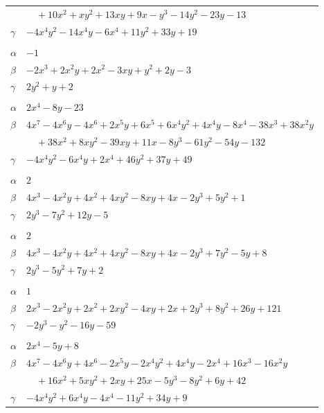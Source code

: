 \documentclass[11pt]{article}
\begin{document}
\begin{longtable}{@{}ll@{}}
 & $\quad +10x^{2}+xy^{2}+13xy+9x-y^{3}-14y^{2}-23y-13$\\
$\gamma$ & $-4x^{4}y^{2}-14x^{4}y-6x^{4}+11y^{2}+33y+19$\\
\addlinespace[3pt]
\multicolumn{2}{@{}l}{$\{i,j\}=\{6,20\}$, $k_{ij}=2^{2}$}\\
$\alpha$ & $-1$\\
$\beta$ & $-2x^{3}+2x^{2}y+2x^{2}-3xy+y^{2}+2y-3$\\
$\gamma$ & $2y^{2}+y+2$\\
\addlinespace[3pt]
\multicolumn{2}{@{}l}{$\{i,j\}=\{6,29\}$, $k_{ij}=2^{2}\cdot 3\cdot 5$}\\
$\alpha$ & $2x^{4}-8y-23$\\
$\beta$ & $4x^{7}-4x^{6}y-4x^{6}+2x^{5}y+6x^{5}+6x^{4}y^{2}+4x^{4}y-8x^{4}-38x^{3}+38x^{2}y$\\
 & $\quad +38x^{2}+8xy^{2}-39xy+11x-8y^{3}-61y^{2}-54y-132$\\
$\gamma$ & $-4x^{4}y^{2}-6x^{4}y+2x^{4}+46y^{2}+37y+49$\\
\addlinespace[3pt]
\multicolumn{2}{@{}l}{$\{i,j\}=\{7,9\}$, $k_{ij}=2^{3}$}\\
$\alpha$ & $2$\\
$\beta$ & $4x^{3}-4x^{2}y+4x^{2}+4xy^{2}-8xy+4x-2y^{3}+5y^{2}+1$\\
$\gamma$ & $2y^{3}-7y^{2}+12y-5$\\
\addlinespace[3pt]
\multicolumn{2}{@{}l}{$\{i,j\}=\{7,10\}$, $k_{ij}=2^{2}\cdot 3$}\\
$\alpha$ & $2$\\
$\beta$ & $4x^{3}-4x^{2}y+4x^{2}+4xy^{2}-8xy+4x-2y^{3}+7y^{2}-5y+8$\\
$\gamma$ & $2y^{3}-5y^{2}+7y+2$\\
\addlinespace[3pt]
\multicolumn{2}{@{}l}{$\{i,j\}=\{7,13\}$, $k_{ij}=2^{4}\cdot 3\cdot 5$}\\
$\alpha$ & $1$\\
$\beta$ & $2x^{3}-2x^{2}y+2x^{2}+2xy^{2}-4xy+2x+2y^{3}+8y^{2}+26y+121$\\
$\gamma$ & $-2y^{3}-y^{2}-16y-59$\\
\addlinespace[3pt]
\multicolumn{2}{@{}l}{$\{i,j\}=\{7,16\}$, $k_{ij}=2\cdot 5^{2}$}\\
$\alpha$ & $2x^{4}-5y+8$\\
$\beta$ & $4x^{7}-4x^{6}y+4x^{6}-2x^{5}y-2x^{4}y^{2}+4x^{4}y-2x^{4}+16x^{3}-16x^{2}y$\\
 & $\quad +16x^{2}+5xy^{2}+2xy+25x-5y^{3}-8y^{2}+6y+42$\\
$\gamma$ & $-4x^{4}y^{2}+6x^{4}y-4x^{4}-11y^{2}+34y+9$\\

\end{longtable}
\end{document}
